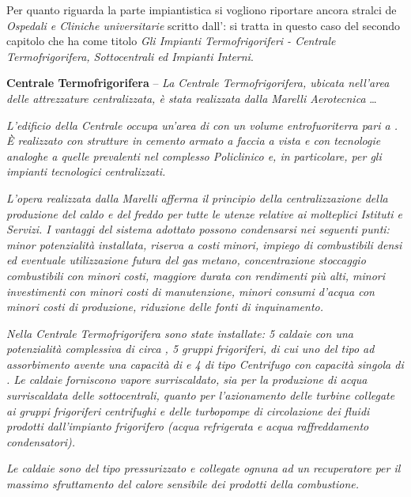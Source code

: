 \noindent Per quanto riguarda la parte impiantistica si vogliono riportare ancora stralci de \emph{Ospedali e Cliniche universitarie} scritto dall': si tratta in questo caso del secondo capitolo che ha come titolo \emph{Gli Impianti Termofrigoriferi - \emph{Centrale Termofrigorifera, Sottocentrali ed Impianti Interni}}.
\begin{quoting}
	\textbf{Centrale Termofrigorifera} -- \emph{La Centrale Termofrigorifera, ubicata nell'area delle attrezzature centralizzata, è stata realizzata dalla Marelli Aerotecnica} \dots
		
\sdots 
	
	\emph{L'edificio della Centrale occupa un'area di  con un volume entrofuoriterra pari a . È realizzato con strutture in cemento armato a faccia a vista e con tecnologie analoghe a quelle prevalenti nel complesso Policlinico e, in particolare, per gli impianti tecnologici centralizzati.}
	
	\emph{L'opera realizzata dalla Marelli afferma il principio della centralizzazione della produzione del caldo e del freddo per tutte le utenze relative ai molteplici Istituti e Servizi. I vantaggi del sistema adottato possono condensarsi nei seguenti punti: minor potenzialità installata, riserva a costi minori, impiego di combustibili densi ed eventuale utilizzazione futura del gas metano, concentrazione stoccaggio combustibili con minori costi, maggiore durata con rendimenti più alti, minori investimenti con minori costi di manutenzione, minori consumi d'acqua con minori costi di produzione, riduzione delle fonti di inquinamento.}
	
	\emph{Nella Centrale Termofrigorifera sono state installate: 5 caldaie con una potenzialità complessiva di circa , 5 gruppi frigoriferi, di cui uno del tipo ad assorbimento avente una capacità di  e 4 di tipo Centrifugo con capacità singola di . Le caldaie forniscono vapore surriscaldato, sia per la produzione di acqua surriscaldata delle sottocentrali, quanto per l'azionamento delle turbine collegate ai gruppi frigoriferi centrifughi e delle turbopompe di circolazione dei fluidi prodotti dall'impianto frigorifero (acqua refrigerata e acqua raffreddamento condensatori).}
	
	\emph{Le caldaie sono del tipo pressurizzato e collegate ognuna ad un recuperatore per il massimo sfruttamento del calore sensibile dei prodotti della combustione.}
	

\end{quoting}
